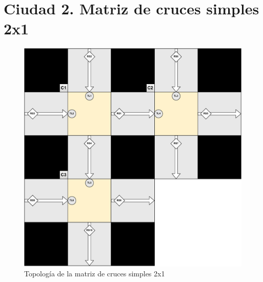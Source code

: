 \section{Ciudad 2. Matriz de cruces simples 2x1}
\begin{figure}[H]
    \centering
    \includegraphics[width=1\linewidth]{text/image/DCruc-CSimple2x1-Topologia.pdf}
    \caption{Topología de la matriz de cruces simples 2x1}
    \label{fig:cruce_simple2x1_topologia}
\end{figure}

\newpage
